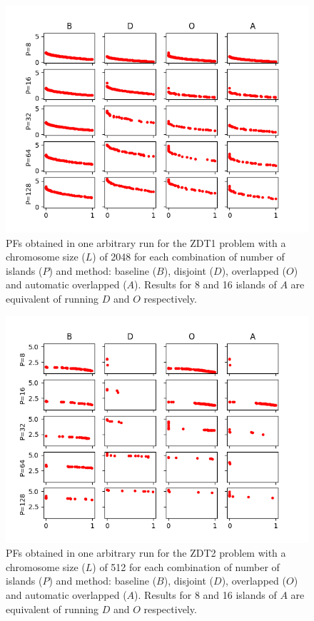 \documentclass[preprint]{elsarticle}
\begin{document}
\begin{figure}
\centering
\includegraphics[width=12cm]{plot_zdt1_2048.png}
\caption{PFs obtained in one arbitrary run for the ZDT1 problem with a chromosome size ($L$) of 2048 for each combination of number of islands ($P$) and method: baseline ($B$), disjoint ($D$), overlapped ($O$) and automatic overlapped ($A$). Results for 8 and 16 islands of $A$ are equivalent of running $D$ and $O$ respectively. }
\label{fig:plot_zdt1_2048}
\end{figure}






\begin{figure}
\centering
\includegraphics[width=12cm]{plot_zdt2_512.png}
\caption{PFs obtained in one arbitrary run for the ZDT2 problem with a chromosome size ($L$) of 512 for each combination of number of islands ($P$) and method: baseline ($B$), disjoint ($D$), overlapped ($O$) and automatic overlapped ($A$). Results for 8 and 16 islands of $A$ are equivalent of running $D$ and $O$ respectively. }
\label{fig:plot_zdt2_512}
\end{figure}
\end{document}
